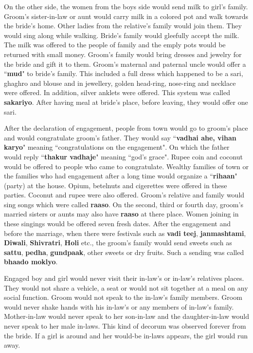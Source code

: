 On the other side, the women from the boys side would send milk to girl's
family. Groom's sister-in-law or aunt would carry milk in a colored pot and
walk towards the bride's home. Other ladies from the relative's family would
join them. They would sing along while walking. Bride's family would gleefully
accept the milk. The milk was offered to the people of family and the emply
pots would be returned with small money. Groom's family would bring dresses and
jewelry for the bride and gift it to them. Groom's maternal and paternal uncle
would offer a ``\textbf{mud}" to bride's family. This included a full dress
which happened to be a sari, ghaghro and blouse and in jewellery, golden
head-ring, nose-ring and necklace were offered. In addition, silver anklets
were offered. This system was called \textbf{sakariyo}. After having meal at
bride's place, before leaving, they would offer one sari.

After the declaration of engagement, people from town would go to groom's place
and would congratulate groom's father. They would say ``\textbf{vadhai ahe,
vihan karyo}" meaning ``congratulations on the engagement". On which the father
would reply ``\textbf{thakur vadhaje}" meaning ``god's grace". Rupee coin and
coconut would be offered to people who came to congratulate. Wealthy families
of town or the families who had engagement after a long time would organize a
``\textbf{rihaan}" (party) at the house. Opium, betelnuts and cigerettes were
offered in these parties. Coconut and rupee were also offered. Groom's relative
and family would sing songs which were called \textbf{raaso}. On the second,
third or fourth day, groom's married sisters or aunts may also have
\textbf{raaso} at there place. Women joining in these singings would be offered
seven fresh dates. After the engagement and before the marriage, when there
were festivals such as \textbf{vadi teej}, \textbf{janmashtami},
\textbf{Diwali}, \textbf{Shivratri}, \textbf{Holi} etc., the groom's family
would send sweets such as \textbf{sattu}, \textbf{pedha}, \textbf{gundpaak},
other sweets or dry fruits. Such a sending was called \textbf{bhaado moklyo}.

Engaged boy and girl would never visit their in-law's or in-law's relatives
places. They would not share a vehicle, a seat or would not sit together at a
meal on any social function. Groom would not speak to the in-law's family
members. Groom would never shake hands with his in-law's or any members of
in-law's family. Mother-in-law would never speak to her son-in-law and the
daughter-in-law would never speak to her male in-laws. This kind of decorum was
observed forever from the bride. If a girl is around and her would-be in-laws
appears, the girl would run away.

